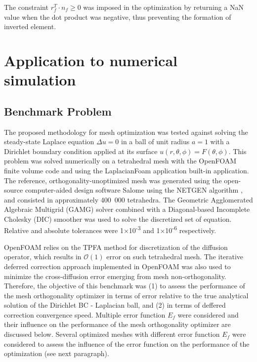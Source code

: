 \documentclass[11pt]{article}
\begin{document}
The constraint $r_f^T \cdot n_f \geq 0$ was imposed in the optimization by returning a NaN value when the dot product was negative, thus preventing the formation of inverted element.



\section{Application to numerical simulation}

\subsection{Benchmark Problem}

The proposed methodology for mesh optimization was tested against solving the steady-state Laplace equation $\Delta u = 0$ in a ball of unit radius $a=1$ with a Dirichlet boundary condition applied at its surface $u(r,\theta,\phi) = F(\theta,\phi)$. %
This problem was solved numerically on a tetrahedral mesh with the OpenFOAM finite volume code \cite{} and using the LaplacianFoam application built-in application.
The reference, orthogonality-unoptimized mesh was generated using the open-source computer-aided design software Salome using the NETGEN algorithm \cite{schrobert_netgen}, and consisted in approximately 400~000 tetrahedra.
The Geometric Agglomerated Algebraic Multigrid (GAMG) solver combined with a Diagonal-based Incomplete Cholesky (DIC) smoother was used to solve the discretized set of equation. 
Relative and absolute tolerances were 1$\times$10\textsuperscript{-3} and 1$\times$10\textsuperscript{-6} respectively.

OpenFOAM relies on the TPFA method for discretization of the diffusion operator, which results in $\mathcal{O}(1)$ error on such tetrahedral mesh.
The iterative deferred correction approach implemented in OpenFOAM was also used to minimize the cross-diffusion error emerging from mesh non-orthogonality.
Therefore, the objective of this benchmark was (1) to assess the performance of the mesh orthogonality optimizer in terms of error relative to the true analytical solution of the Dirichlet BC - Laplacian ball, and (2) in terms of deffered correction convergence speed.
Multiple error function $E_f$ were considered and their influence on the performance of the mesh orthogonality optimizer are discussed below.
Several optimized meshes with different error function $E_f$ were considered to assess the influence of the error function on the performance of the optimization (see next paragraph).
\end{document}
